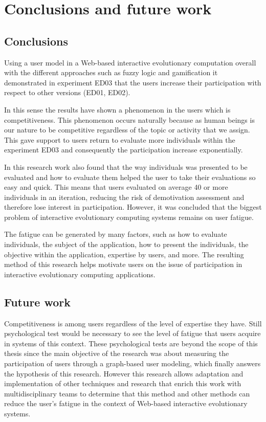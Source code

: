 \chapter{Conclusions and future work} \label{sec:5}

\section{Conclusions}
Using a user model in a Web-based interactive evolutionary computation  overall
with the different approaches such as fuzzy logic and gamification it
demonstrated  in experiment ED03 that the users increase their
participation with respect to other versions (ED01, ED02).

In this sense the results have shown a phenomenon in the users which is
competitiveness. This phenomenon occurs naturally because as human beings is our
nature to be competitive regardless of the topic or activity that we assign.
This gave support to users return to evaluate more individuals
within the experiment ED03 and consequently the participation increase
exponentially.

In this research work also found that the way individuals was presented to be
evaluated and how to evaluate them helped the user to take their evaluations so
easy and quick. This means that users evaluated on average 40 or more
individuals in an iteration, reducing the risk of demotivation assessment and
therefore lose interest in participation. However, it was concluded that the
biggest problem of interactive evolutionary computing systems remains on user
fatigue.

The fatigue can be generated by many factors, such as how to evaluate
individuals, the subject of the application, how to present the individuals, the
objective within the application, expertise by users, and more. The resulting
method of this research helps motivate users on the issue of participation in
interactive evolutionary computing applications.


\section{Future work}

Competitiveness is among users regardless of the level of expertise they have.
Still psychological test would be necessary to see the level of fatigue that
users acquire in systems of this context. These psychological tests are beyond
the scope of this thesis since the main objective of the research was about
measuring the participation of users through a graph-based user modeling, which
finally answers  the hypothesis of this research. However this research allows
adaptation and implementation of other techniques and research that enrich this
work with multidisciplinary teams to determine that this method and other
methods can reduce the user's fatigue in the context of Web-based interactive
evolutionary systems.

